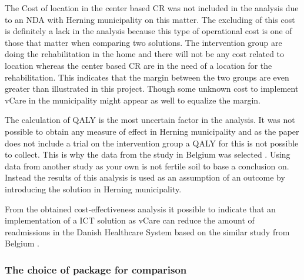 The Cost of location in the center based CR was not included in the analysis due to an NDA with Herning municipality on this matter.  The excluding of this cost is definitely a lack in the analysis because this type of operational cost is one of those that matter when comparing two solutions. The intervention group are doing the rehabilitation in the home and there will not be any cost related to location whereas the center based CR are in the need of a location for the rehabilitation. This indicates that the margin between the two groups are even greater than illustrated in this project.  Though some unknown cost to implement vCare in the municipality might appear as well to equalize the margin. 

The calculation of QALY is the most uncertain factor in the analysis. It was not possible to obtain any measure of effect in Herning municipality and as the paper does not include a trial on the intervention group a QALY for this is not possible to collect. This is why the data from the study in Belgium was selected \cite{costeffect}. Using data from another study as your own is not fertile soil to base a conclusion on. Instead the results of this analysis is used as an assumption of an outcome by introducing the solution in Herning municipality. 

From the obtained cost-effectiveness analysis it possible to indicate that an implementation of a ICT solution as vCare can reduce the amount of readmissions in the Danish Healthcare System based on the similar study from Belgium \cite{costeffect}.

\subsubsection{The choice of package for comparison}

